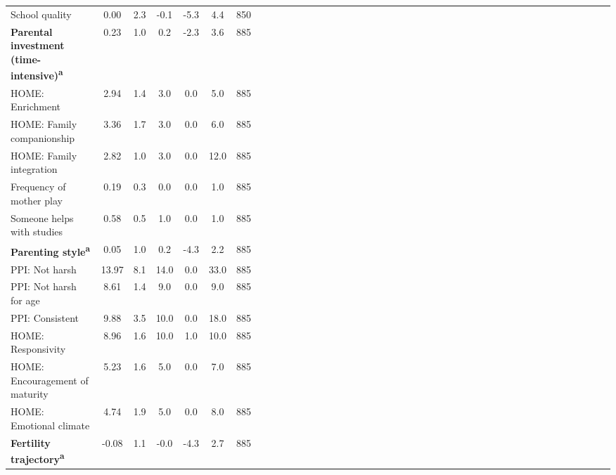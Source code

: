 {\begin{tabular}{l*{6}{ccccccc}}
\hspace{0.25cm} School quality&     0.00&      2.3&     -0.1&     -5.3&      4.4&      850\\
\textbf{Parental investment (time-intensive)\textsuperscript{a}}&     0.23&      1.0&      0.2&     -2.3&      3.6&      885\\
\hspace{0.25cm} HOME: Enrichment&     2.94&      1.4&      3.0&      0.0&      5.0&      885\\
\hspace{0.25cm} HOME: Family companionship     &     3.36&      1.7&      3.0&      0.0&      6.0&      885\\
\hspace{0.25cm} HOME: Family integration       &     2.82&      1.0&      3.0&      0.0&     12.0&      885\\
\hspace{0.25cm} Frequency of mother play       &     0.19&      0.3&      0.0&      0.0&      1.0&      885\\
\hspace{0.25cm} Someone helps with studies     &     0.58&      0.5&      1.0&      0.0&      1.0&      885\\
\textbf{Parenting style\textsuperscript{a}}&     0.05&      1.0&      0.2&     -4.3&      2.2&      885\\
\hspace{0.25cm} PPI: Not harsh&    13.97&      8.1&     14.0&      0.0&     33.0&      885\\
\hspace{0.25cm} PPI: Not harsh for age&     8.61&      1.4&      9.0&      0.0&      9.0&      885\\
\hspace{0.25cm} PPI: Consistent&     9.88&      3.5&     10.0&      0.0&     18.0&      885\\
\hspace{0.25cm} HOME: Responsivity&     8.96&      1.6&     10.0&      1.0&     10.0&      885\\
\hspace{0.25cm} HOME: Encouragement of maturity&     5.23&      1.6&      5.0&      0.0&      7.0&      885\\
\hspace{0.25cm} HOME: Emotional climate&     4.74&      1.9&      5.0&      0.0&      8.0&      885\\
\textbf{Fertility trajectory\textsuperscript{a}}&    -0.08&      1.1&     -0.0&     -4.3&      2.7&      885\\

\end{tabular}}
